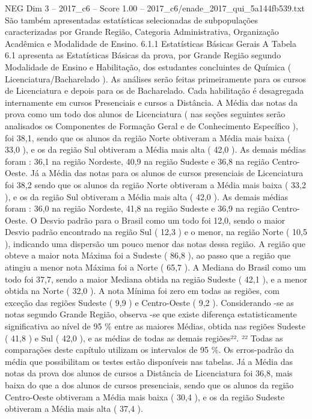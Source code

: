 \begin{textsample}{NEG Dim 3 – 2017\_c6 – Score 1.00 – 2017\_c6/enade\_2017\_qui\_5a144fb539.txt}
São também apresentadas estatísticas selecionadas de subpopulações caracterizadas por Grande Região, Categoria Administrativa, Organização Acadêmica e Modalidade de Ensino. 6.1.1 Estatísticas Básicas Gerais A Tabela 6.1 apresenta as Estatísticas Básicas da prova, por Grande Região segundo Modalidade de Ensino e Habilitação, dos estudantes concluintes de Química ( Licenciatura/Bacharelado ).
As análises serão feitas primeiramente para os cursos de Licenciatura e depois para os de Bacharelado.
Cada habilitação é desagregada internamente em cursos Presenciais e cursos a Distância.
A Média das notas da prova como um todo dos alunos de Licenciatura ( nas seções seguintes serão analisados os Componentes de Formação Geral e de Conhecimento Específico ), foi 38,1, sendo que os alunos da região Norte obtiveram a Média mais baixa ( 33,0 ), e os da região Sul obtiveram a Média mais alta ( 42,0 ).
As demais médias foram : 36,1 na região Nordeste, 40,9 na região Sudeste e 36,8 na região Centro-Oeste.
Já a Média das notas para os alunos de cursos presenciais de Licenciatura foi 38,2 sendo que os alunos da região Norte obtiveram a Média mais baixa ( 33,2 ), e os da região Sul obtiveram a Média mais alta ( 42,0 ).
As demais médias foram : 36,0 na região Nordeste, 41,8 na região Sudeste e 36,9 na região Centro-Oeste.
O Desvio padrão para o Brasil como um todo foi 12,0, sendo o maior Desvio padrão encontrado na região Sul ( 12,3 ) e o menor, na região Norte ( 10,5 ), indicando uma dispersão um pouco menor das notas dessa região.
A região que obteve a maior nota Máxima foi a Sudeste ( 86,8 ), ao passo que a região que atingiu a menor nota Máxima foi a Norte ( 65,7 ).
A Mediana do Brasil como um todo foi 37,7, sendo a maior Mediana obtida na região Sudeste ( 42,1 ), e a menor obtida na Norte ( 32,0 ).
A nota Mínima foi zero em todas as regiões, com exceção das regiões Sudeste ( 9,9 ) e Centro-Oeste ( 9,2 ).
Considerando -se as notas segundo Grande Região, observa -se que existe diferença estatisticamente significativa ao nível de 95 \% entre as maiores Médias, obtida nas regiões Sudeste ( 41,8 ) e Sul ( 42,0 ), e as médias de todas as demais regiões²². ²² Todas as comparações deste capítulo utilizam os intervalos de 95 \%.
Os erros-padrão da média que possibilitam os testes estão disponíveis nas tabelas.
Já a Média das notas da prova dos alunos de cursos a Distância de Licenciatura foi 36,8, mais baixa do que a dos alunos de cursos presenciais, sendo que os alunos da região Centro-Oeste obtiveram a Média mais baixa ( 30,4 ), e os da região Sudeste obtiveram a Média mais alta ( 37,4 ).

\end{textsample}
